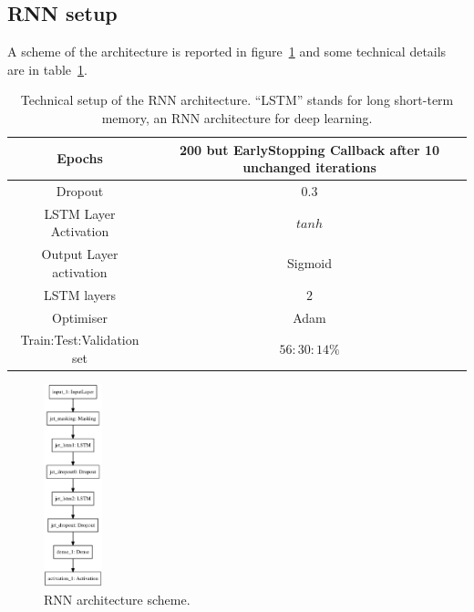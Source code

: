 
\subsection{RNN setup}
A scheme of the architecture is reported in figure~\ref{fig:RNNArchitecture} and some technical details are in table~\ref{tab:RNNArchitecture}.
\begin{table}[ht]
\centering
\begin{tabular}{c|c}
\toprule
\midrule
Epochs     & 200 but EarlyStopping Callback after 10 unchanged iterations     \\
\midrule
Dropout     & $0.3 $   \\
\midrule
LSTM Layer Activation     & $tanh $   \\
\midrule
Output Layer activation     & Sigmoid   \\
\midrule
LSTM layers     & $2$   \\
\midrule
Optimiser     & Adam   \\
\midrule
Train:Test:Validation set     & $56:30:14 \%$   \\
\midrule
\bottomrule
\end{tabular}
\caption{Technical setup of the RNN architecture. ``LSTM'' stands for long short-term memory, an RNN architecture for deep learning.}
\label{tab:RNNArchitecture}
\end{table}

\begin{figure}[ht]
       \centering
       \includegraphics[width=0.15\textwidth]{figures/RNN/model.eps}
       \caption{RNN architecture scheme.}
       \label{fig:RNNArchitecture}
\end{figure}

